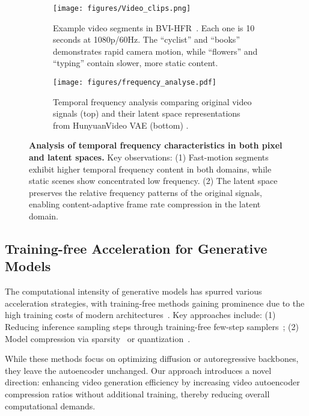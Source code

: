 \begin{figure*}[!th]
    \centering
    \begin{minipage}{\textwidth}
    \centering
    \begin{subfigure}{0.57\textwidth}
    \texttt{[image: figures/Video\_clips.png]}
    \captionsetup{font=small}
    \caption{Example video segments in BVI-HFR~\cite{mackin2018study}. Each one is 10 seconds at 1080p/60Hz. The ``cyclist'' and ``books'' demonstrates rapid camera motion, while ``flowers'' and ``typing'' contain slower, more static content.}
    \label{fig:video_examples}
    \end{subfigure}
    \hspace{0.05in}
    \begin{subfigure}{0.41\textwidth}
    \centering
    \texttt{[image: figures/frequency\_analyse.pdf]}
    \captionsetup{font=small}
    \vspace{-0.1in}
    \caption{Temporal frequency analysis comparing original video signals (top) and their latent space representations from HunyuanVideo VAE (bottom) \cite{kong2024hunyuanvideo}.}
    \label{fig:analysis_on_video_seg}
    \end{subfigure}
    \end{minipage}
    \vspace{-0.13in}
    \caption{\textbf{Analysis of temporal frequency characteristics in both pixel and latent spaces.} Key observations: (1) Fast-motion segments exhibit higher temporal frequency content in both domains, while static scenes show concentrated low frequency. (2) The latent space preserves the relative frequency patterns of the original signals, enabling content-adaptive frame rate compression in the latent domain.}
    \vspace{-0.2in}
\label{fig:motivation}
\end{figure*}

\subsection{Training-free Acceleration for Generative Models}
The computational intensity of generative models has spurred various acceleration strategies, with training-free methods gaining prominence due to the high training costs of modern architectures~\cite{ma2024efficient}. Key approaches include: (1) Reducing inference sampling steps through training-free few-step samplers~\cite{song2020denoising,lu2022dpm,lu2022dpmp,zhang2022fast};
(2) Model compression via sparsity~\cite{ma2024deepcache,yuan2024ditfastattn} or quantization~\cite{shang2023post,li2023q,wang2024quest,wu2024ptq4dit,li2024svdqunat}.

While these methods focus on optimizing diffusion or autoregressive backbones, they leave the autoencoder unchanged. Our approach introduces a novel direction: enhancing video generation efficiency by increasing video autoencoder compression ratios without additional training, thereby reducing overall computational demands.